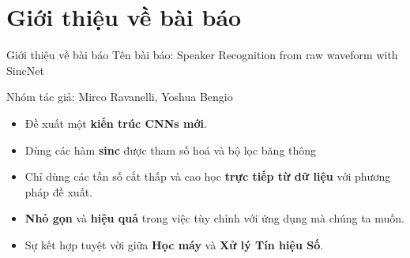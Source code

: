 \documentclass[notheorems, aspectratio=54]{beamer}
\begin{document}
\section{Giới thiệu về bài báo}
\begin{frame}{Giới thiệu về bài báo}
	Tên bài báo: Speaker Recognition from raw waveform with SincNet
	
	Nhóm tác giả: Mirco Ravanelli, Yoshua Bengio
	\begin{itemize}
		\item Đề xuất một \textbf{kiến trúc CNNs mới}.
		\item Dùng các hàm \textbf{sinc} được tham số hoá và bộ lọc băng thông
		\item Chỉ dùng các tần số cắt thấp và cao học \textbf{trực tiếp từ dữ liệu} với phương pháp đề xuất.
		\item \textbf{Nhỏ gọn} và \textbf{hiệu quả} trong việc tùy chỉnh với ứng dụng mà chúng ta muốn.
		\item Sự kết hợp tuyệt vời giữa \textbf{Học máy} và \textbf{Xử lý Tín hiệu Số}.
	\end{itemize}
\end{frame}
\end{document}
